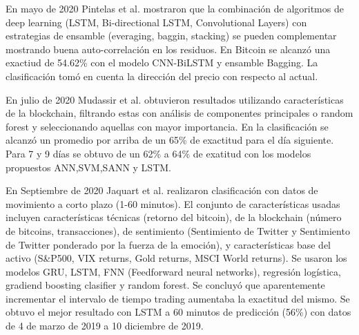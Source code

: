 
En mayo de 2020 Pintelas et al. \cite{pintelasInvestigatingProblemCryptocurrency2020} mostraron que la combinación de algoritmos de deep learning (LSTM, Bi-directional LSTM, Convolutional Layers) con estrategias de ensamble (everaging, baggin, stacking) se pueden complementar mostrando buena auto-correlación en los residuos.  En Bitcoin se alcanzó una exactiud de 54.62\% con el modelo CNN-BiLSTM y ensamble Bagging. La clasificación tomó en cuenta la dirección del precio con respecto al actual.

En julio de 2020 Mudassir et al. \cite{mudassirTimeseriesForecastingBitcoin2020} obtuvieron resultados utilizando características de la blockchain, filtrando estas con análisis de componentes principales o random forest y seleccionando aquellas con mayor importancia. En la clasificación se alcanzó un promedio por arriba de un 65\% de exactitud para el día siguiente. Para 7 y 9 días se obtuvo de un 62\% a 64\% de exatitud con los modelos propuestos ANN,SVM,SANN y LSTM. 

En Septiembre de 2020 Jaquart et al. \cite{jaquartShorttermBitcoinMarket2021} realizaron clasificación con datos de movimiento a corto plazo (1-60 minutos). El conjunto de características usadas incluyen características técnicas (retorno del bitcoin), de la blockchain (número de bitcoins, transacciones), de sentimiento (Sentimiento de Twitter y Sentimiento de Twitter ponderado por la fuerza de la emoción), y características base del activo (S\&P500, VIX returns, Gold returns, MSCI World returns). Se usaron los modelos GRU, LSTM, FNN (Feedforward neural networks), regresión logística, gradiend boosting clasifier y random forest. Se concluyó que aparentemente incrementar el intervalo de tiempo trading aumentaba la exactitud del mismo. Se obtuvo el mejor resultado con LSTM a 60 minutos de predicción (56\%) con datos de 4 de marzo de 2019 a 10 diciembre de 2019.

